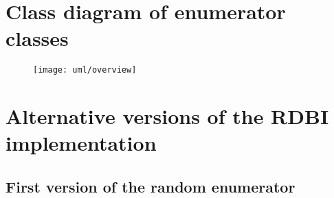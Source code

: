 \chapter{Class diagram of enumerator classes}
\label{app:uml}

\begin{figure}[H]
    \centering
    \texttt{[image: uml/overview]}
\end{figure}

\chapter{Alternative versions of the RDBI implementation}

\section{First version of the random enumerator}
\label{app:random-not-compact}

